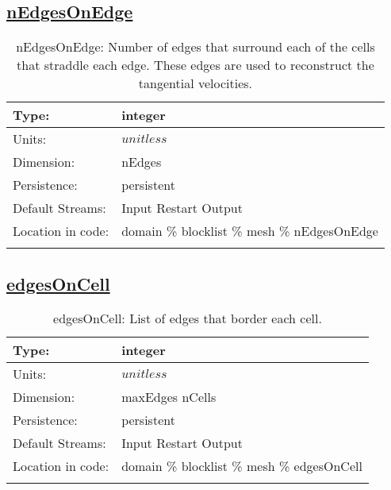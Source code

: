 \subsection[nEdgesOnEdge]{\hyperref[sec:var_tab_mesh]{nEdgesOnEdge}}
\label{subsec:var_sec_mesh_nEdgesOnEdge}
\begin{center}
\begin{longtable}{| p{2.0in} | p{4.0in} |}
        \hline 
        Type: & integer \\
        \hline 
        Units: & $unitless$ \\
        \hline 
        Dimension: & nEdges \\
        \hline 
        Persistence: & persistent \\
        \hline 
		 Default Streams: & Input Restart Output  \\
        \hline 
		 Location in code: & domain \% blocklist \% mesh \% nEdgesOnEdge \\
		 \hline 
    \caption{nEdgesOnEdge: Number of edges that surround each of the cells that straddle each edge. These edges are used to reconstruct the tangential velocities.}
\end{longtable}
\end{center}
\subsection[edgesOnCell]{\hyperref[sec:var_tab_mesh]{edgesOnCell}}
\label{subsec:var_sec_mesh_edgesOnCell}
\begin{center}
\begin{longtable}{| p{2.0in} | p{4.0in} |}
        \hline 
        Type: & integer \\
        \hline 
        Units: & $unitless$ \\
        \hline 
        Dimension: & maxEdges nCells \\
        \hline 
        Persistence: & persistent \\
        \hline 
		 Default Streams: & Input Restart Output  \\
        \hline 
		 Location in code: & domain \% blocklist \% mesh \% edgesOnCell \\
		 \hline 
    \caption{edgesOnCell: List of edges that border each cell.}
\end{longtable}
\end{center}
